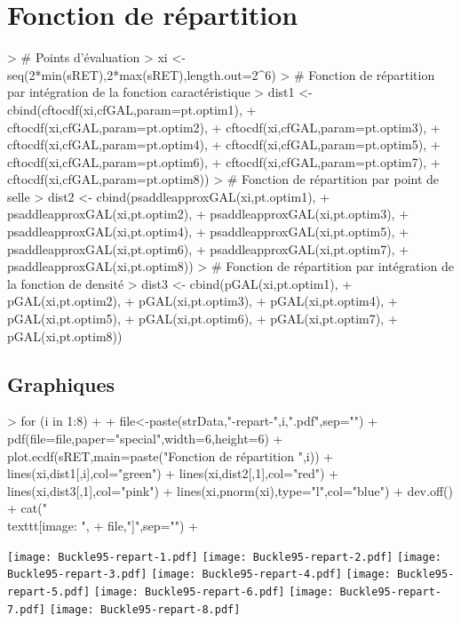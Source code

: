 \documentclass[letter]{report}
\begin{document}
\section{Fonction de répartition}
\begin{Schunk}
\begin{Sinput}
> # Points d'évaluation
> xi <- seq(2*min(sRET),2*max(sRET),length.out=2^6)
> # Fonction de répartition par intégration de la fonction caractéristique
> dist1 <- cbind(cftocdf(xi,cfGAL,param=pt.optim1),
+ 		cftocdf(xi,cfGAL,param=pt.optim2),
+ 		cftocdf(xi,cfGAL,param=pt.optim3),
+ 		cftocdf(xi,cfGAL,param=pt.optim4),
+ 		cftocdf(xi,cfGAL,param=pt.optim5),
+ 		cftocdf(xi,cfGAL,param=pt.optim6),
+ 		cftocdf(xi,cfGAL,param=pt.optim7),
+ 		cftocdf(xi,cfGAL,param=pt.optim8))
> # Fonction de répartition par point de selle
> dist2 <- cbind(psaddleapproxGAL(xi,pt.optim1),
+ 		psaddleapproxGAL(xi,pt.optim2),
+ 		psaddleapproxGAL(xi,pt.optim3),
+ 		psaddleapproxGAL(xi,pt.optim4),
+ 		psaddleapproxGAL(xi,pt.optim5),
+ 		psaddleapproxGAL(xi,pt.optim6),
+ 		psaddleapproxGAL(xi,pt.optim7),
+ 		psaddleapproxGAL(xi,pt.optim8))
> # Fonction de répartition par intégration de la fonction de densité
> dist3 <- cbind(pGAL(xi,pt.optim1),
+ 		pGAL(xi,pt.optim2),
+ 		pGAL(xi,pt.optim3),
+ 		pGAL(xi,pt.optim4),
+ 		pGAL(xi,pt.optim5),
+ 		pGAL(xi,pt.optim6),
+ 		pGAL(xi,pt.optim7),
+ 		pGAL(xi,pt.optim8))
\end{Sinput}
\end{Schunk}
\pagebreak
\subsection{Graphiques}

\begin{Schunk}
\begin{Sinput}
> for (i in 1:8)
+ {
+ 	file<-paste(strData,"-repart-",i,".pdf",sep="")
+ 	pdf(file=file,paper="special",width=6,height=6)
+ 	plot.ecdf(sRET,main=paste("Fonction de répartition ",i))
+ 	lines(xi,dist1[,i],col="green")
+ 	lines(xi,dist2[,1],col="red")
+ 	lines(xi,dist3[,1],col="pink")
+ 	lines(xi,pnorm(xi),type="l",col="blue")
+ 	dev.off()
+ 	cat("\\texttt{[image: ",
+ 			file,"]}\n",sep="")
+ }
\end{Sinput}
\texttt{[image: Buckle95-repart-1.pdf]}
\texttt{[image: Buckle95-repart-2.pdf]}
\texttt{[image: Buckle95-repart-3.pdf]}
\texttt{[image: Buckle95-repart-4.pdf]}
\texttt{[image: Buckle95-repart-5.pdf]}
\texttt{[image: Buckle95-repart-6.pdf]}
\texttt{[image: Buckle95-repart-7.pdf]}
\texttt{[image: Buckle95-repart-8.pdf]}\end{Schunk}
\end{document}
